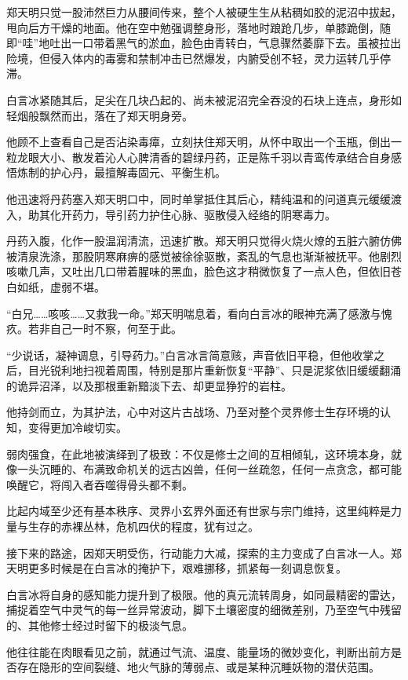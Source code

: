 郑天明只觉一股沛然巨力从腰间传来，整个人被硬生生从粘稠如胶的泥沼中拔起，甩向后方干燥的地面。他在空中勉强调整身形，落地时踉跄几步，单膝跪倒，随即“哇”地吐出一口带着黑气的淤血，脸色由青转白，气息骤然萎靡下去。虽被拉出险境，但侵入体内的毒雾和禁制冲击已然爆发，内腑受创不轻，灵力运转几乎停滞。

白言冰紧随其后，足尖在几块凸起的、尚未被泥沼完全吞没的石块上连点，身形如轻烟般飘然而出，落在了郑天明身旁。

他顾不上查看自己是否沾染毒瘴，立刻扶住郑天明，从怀中取出一个玉瓶，倒出一粒龙眼大小、散发着沁人心脾清香的碧绿丹药，正是陈千羽以青鸾传承结合自身感悟炼制的护心丹，最擅解毒固元、平衡生机。

他迅速将丹药塞入郑天明口中，同时单掌抵住其后心，精纯温和的问道真元缓缓渡入，助其化开药力，导引药力护住心脉、驱散侵入经络的阴寒毒力。

丹药入腹，化作一股温润清流，迅速扩散。郑天明只觉得火烧火燎的五脏六腑仿佛被清泉洗涤，那股阴寒麻痹的感觉被徐徐驱散，紊乱的气息也渐渐被抚平。他剧烈咳嗽几声，又吐出几口带着腥味的黑血，脸色这才稍微恢复了一点人色，但依旧苍白如纸，虚弱不堪。

“白兄……咳咳……又救我一命。”郑天明喘息着，看向白言冰的眼神充满了感激与愧疚。若非自己一时不察，何至于此。

“少说话，凝神调息，引导药力。”白言冰言简意赅，声音依旧平稳，但他收掌之后，目光锐利地扫视着周围，特别是那片重新恢复“平静”、只是泥浆依旧缓缓翻涌的诡异沼泽，以及那根重新黯淡下去、却更显狰狞的岩柱。

他持剑而立，为其护法，心中对这片古战场、乃至对整个灵界修士生存环境的认知，变得更加冷峻切实。

弱肉强食，在此地被演绎到了极致：不仅是修士之间的互相倾轧，这环境本身，就像一头沉睡的、布满致命机关的远古凶兽，任何一丝疏忽，任何一点贪念，都可能唤醒它，将闯入者吞噬得骨头都不剩。

比起内域至少还有基本秩序、灵界小玄界外面还有世家与宗门维持，这里纯粹是力量与生存的赤裸丛林，危机四伏的程度，犹有过之。

接下来的路途，因郑天明受伤，行动能力大减，探索的主力变成了白言冰一人。郑天明更多时候是在白言冰的掩护下，艰难挪移，抓紧每一刻调息恢复。

白言冰将自身的感知能力提升到了极限。他的真元流转周身，如同最精密的雷达，捕捉着空气中灵气的每一丝异常波动，脚下土壤密度的细微差别，乃至空气中残留的、其他修士经过时留下的极淡气息。

他往往能在肉眼看见之前，就通过气流、温度、能量场的微妙变化，判断出前方是否存在隐形的空间裂缝、地火气脉的薄弱点、或是某种沉睡妖物的潜伏范围。

